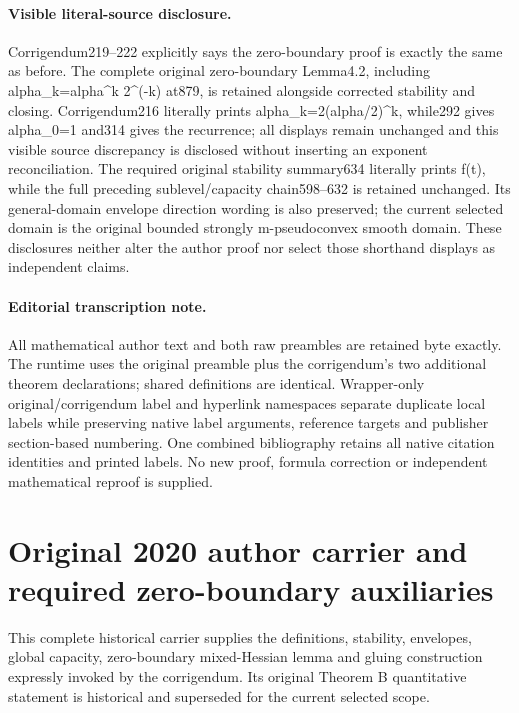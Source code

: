 \documentclass[11pt]{article}
\numberwithin{equation}{section}
\theoremstyle{definition}
\theoremstyle{plain}
\theoremstyle{definition}
\begin{document}
\paragraph{Visible literal-source disclosure.}
Corrigendum219--222 explicitly says the zero-boundary proof is exactly the same as before. The complete original zero-boundary Lemma4.2, including alpha\_k=alpha\textasciicircum{}k 2\textasciicircum{}(-k) at879, is retained alongside corrected stability and closing. Corrigendum216 literally prints alpha\_k=2(alpha/2)\textasciicircum{}k, while292 gives alpha\_0=1 and314 gives the recurrence; all displays remain unchanged and this visible source discrepancy is disclosed without inserting an exponent reconciliation. The required original stability summary634 literally prints f(t), while the full preceding sublevel/capacity chain598--632 is retained unchanged. Its general-domain envelope direction wording is also preserved; the current selected domain is the original bounded strongly m-pseudoconvex smooth domain. These disclosures neither alter the author proof nor select those shorthand displays as independent claims.
\paragraph{Editorial transcription note.}
All mathematical author text and both raw preambles are retained byte exactly. The runtime uses the original preamble plus the corrigendum's two additional theorem declarations; shared definitions are identical. Wrapper-only original/corrigendum label and hyperlink namespaces separate duplicate local labels while preserving native label arguments, reference targets and publisher section-based numbering. One combined bibliography retains all native citation identities and printed labels. No new proof, formula correction or independent mathematical reproof is supplied.
\clearpage
\section*{Original 2020 author carrier and required zero-boundary auxiliaries}
\noindent This complete historical carrier supplies the definitions, stability, envelopes, global capacity, zero-boundary mixed-Hessian lemma and gluing construction expressly invoked by the corrigendum. Its original Theorem B quantitative statement is historical and superseded for the current selected scope.\par\medskip

\end{document}
